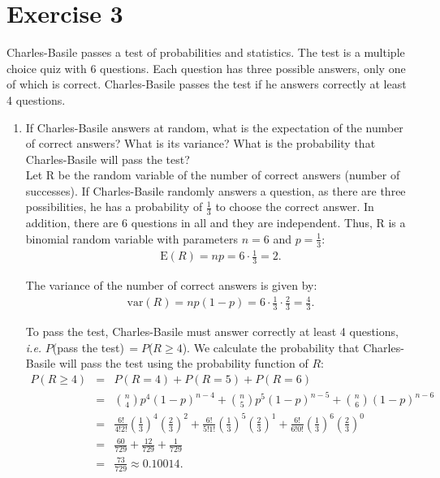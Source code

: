 \documentclass[12pt,thmsa]{article}\usepackage[]{graphicx}\usepackage[]{color}
\begin{document}
\section*{Exercise 3}

Charles-Basile passes a test of probabilities and statistics. The test is a multiple choice quiz with 6 questions. Each question has three possible answers, only one of which is correct. Charles-Basile passes the test if he answers correctly at least 4 questions.


\begin{enumerate}%
\item If Charles-Basile answers at random, what is the expectation of the number of correct answers?
What is its variance? What is the probability that Charles-Basile will pass the test?\\

Let R be the random variable of the number of correct answers (number of successes). If Charles-Basile randomly answers a question, as there are three possibilities, he has a probability of $\frac{1}{3}$ to choose the correct answer. In addition, there are 6 questions in all and they are independent. Thus, R is a binomial random variable with parameters $n = 6$ and $p = \frac{1}{3}$:
\begin{eqnarray*}
   \text{E}(R)=np=6 \cdot \frac{1}{3}=2.
  \end{eqnarray*}

The variance of the number of correct answers is given by:
      \begin{eqnarray*}
   \text{var}(R)=np(1-p)=6 \cdot \frac{1}{3}\cdot \frac{2}{3}=\frac{4}{3}.
  \end{eqnarray*}

  To pass the test, Charles-Basile must answer correctly at least 4 questions, {\it i.e.} $P$(pass the test)$\,=P$($R\geq 4$). We calculate the probability that Charles-Basile will pass the test using the probability function of $ R $:
\begin{eqnarray*}
   P(R\geq 4) & = & \left. P(R=4) + P(R=5) + P(R=6) \right. \nonumber \\
   & = & \left. \binom{n}{4}p^{4}(1-p)^{n-4} + \binom{n}{5}p^{5}(1-p)^{n-5} + \binom{n}{6}(1-p)^{n-6} \right. \nonumber \\
   & = & \left.  \frac{6!}{4!2!}\left(\frac{1}{3}\right)^{4}\left(\frac{2}{3}\right)^{2} + \frac{6!}{5!1!}\left(\frac{1}{3}\right)^{5}\left(\frac{2}{3}\right)^{1} + \frac{6!}{6!0!}\left(\frac{1}{3}\right)^{6}\left(\frac{2}{3}\right)^{0} \right. \nonumber \\
     & = & \left.  \frac{60}{729} + \frac{12}{729}  + \frac{1}{729}  \right. \nonumber \\
   & = & \left. \frac{73}{729} \approx 0.10014. \right. \nonumber \\
  \end{eqnarray*}


\end{enumerate}
\end{document}

